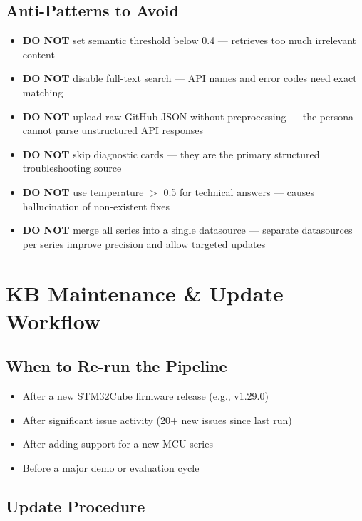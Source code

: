 \documentclass[12pt,a4paper]{report}
\begin{document}
\section{Anti-Patterns to Avoid}

\begin{itemize}
  \item \textbf{DO NOT} set semantic threshold below 0.4 --- retrieves too much irrelevant content
  \item \textbf{DO NOT} disable full-text search --- API names and error codes need exact matching
  \item \textbf{DO NOT} upload raw GitHub JSON without preprocessing --- the persona cannot parse unstructured API responses
  \item \textbf{DO NOT} skip diagnostic cards --- they are the primary structured troubleshooting source
  \item \textbf{DO NOT} use temperature $>$ 0.5 for technical answers --- causes hallucination of non-existent fixes
  \item \textbf{DO NOT} merge all series into a single datasource --- separate datasources per series improve precision and allow targeted updates
\end{itemize}

\chapter{KB Maintenance \& Update Workflow}

\section{When to Re-run the Pipeline}

\begin{itemize}
  \item After a new STM32Cube firmware release (e.g., v1.29.0)
  \item After significant issue activity (20+ new issues since last run)
  \item After adding support for a new MCU series
  \item Before a major demo or evaluation cycle
\end{itemize}

\section{Update Procedure}
\end{document}
